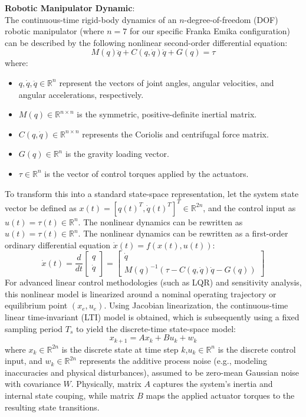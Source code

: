 \noindent\textbf{Robotic Manipulator Dynamic}:\\
The continuous-time rigid-body dynamics of an $n$-degree-of-freedom (DOF) robotic manipulator (where $n = 7$ for our specific Franka Emika configuration) can be described by the following nonlinear second-order differential equation:
\begin{equation}
    M(q)\ddot{q} + C(q,\dot{q})\dot{q} + G(q) = \tau
\end{equation}
where:
\begin{itemize}
    \item $q, \dot{q}, \ddot{q} \in \mathbb{R}^n$ represent the vectors of joint angles, angular velocities, and angular accelerations, respectively.
    \item $M(q) \in \mathbb{R}^{n \times n}$ is the symmetric, positive-definite inertial matrix.
    \item $C(q, \dot{q}) \in \mathbb{R}^{n \times n}$ represents the  Coriolis and centrifugal force matrix.
    \item $G(q) \in \mathbb{R}^n$ is the gravity loading vector.
    \item $\tau \in \mathbb{R}^n$ is the vector of control torques applied by the actuators.
\end{itemize}
To transform this into a standard state-space representation, let the system state vector be defined as $x(t) = [q(t)^T, \dot{q}(t)^T]^T \in \mathbb{R}^{2n}$,
and the control input as $u(t)=\tau(t)\in\mathbb{R}^n$. The nonlinear dynamics can be rewritten as $u(t) = \tau(t) \in \mathbb{R}^n$.
The nonlinear dynamics can be rewritten as a first-order ordinary differential equation $\dot{x}(t) = f(x(t), u(t))$:
\begin{equation}
    \dot{x}(t) = \frac{d}{dt} \begin{bmatrix} q \\ \dot{q} \end{bmatrix} = \begin{bmatrix} \dot{q} \\ M(q)^{-1}(\tau - C(q,\dot{q})\dot{q} - G(q)) \end{bmatrix}
\end{equation}
For advanced linear control methodologies (such as LQR) and sensitivity analysis, this nonlinear model is linearized around a nominal 
operating trajectory or equilibrium point $(x_e,u_e)$. Using Jacobian linearization, the continuous-time linear time-invariant (LTI) model is 
obtained, which is subsequently using a fixed sampling period $T_s$ to yield the discrete-time state-space model:
\begin{equation}
    x_{k+1}=Ax_k+Bu_k+w_k
\end{equation}
where $x_k \in \mathbb{R}^{2n}$ is the discrete state at time step $k$,$u_k \in \mathbb{R}^n$ is the discrete control input, and 
$w_k \in \mathbb{R}^{2n}$ represents the additive process noise (e.g., modeling inaccuracies and physical disturbances), assumed to be 
zero-mean Gaussian noise with covariance $W$.
Physically, matrix $A$ captures the system's inertia and internal state couping, while matrix $B$ maps the applied actuator torques 
to the resulting state transitions.\\


